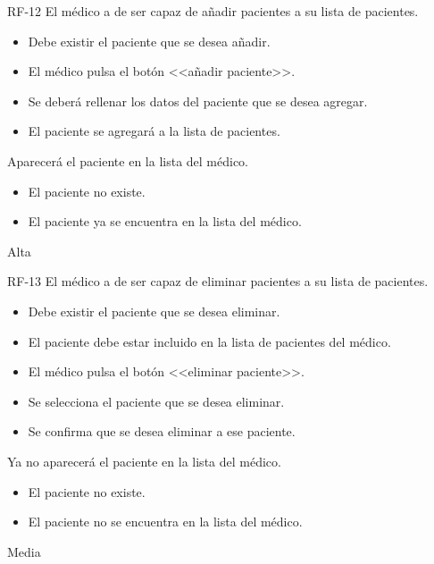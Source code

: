 {RF-12}
{El médico a de ser capaz de añadir pacientes a su lista de pacientes.}
{	\begin{itemize}
	\def\labelenumi{\arabic{enumi}.}
	\tightlist
	\item Debe existir el paciente que se desea añadir.
	\end{itemize}}
{
	\begin{itemize}
	\def\labelenumi{\arabic{enumi}.}
	\tightlist

    \item El médico pulsa el botón <<añadir paciente>>.
    \item Se deberá rellenar los datos del paciente que se desea agregar.
    \item El paciente se agregará a la lista de pacientes.
    
    \end{itemize}
}
{Aparecerá el paciente en la lista del médico.}
{	\begin{itemize}
	\def\labelenumi{\arabic{enumi}.}
	\tightlist

    \item El paciente no existe.
    \item El paciente ya se encuentra en la lista del médico.
    
    \end{itemize}}
{Alta}

{RF-13}
{El médico a de ser capaz de eliminar pacientes a su lista de pacientes.}
{	\begin{itemize}
	\def\labelenumi{\arabic{enumi}.}
	\tightlist
	\item Debe existir el paciente que se desea eliminar.
	\item El paciente debe estar incluido en la lista de pacientes del médico.
	\end{itemize}}
{
	\begin{itemize}
	\def\labelenumi{\arabic{enumi}.}
	\tightlist

    \item El médico pulsa el botón <<eliminar paciente>>.
    \item Se selecciona el paciente que se desea eliminar.
	\item Se confirma que se desea eliminar a ese paciente.
    
    \end{itemize}
}
{Ya no aparecerá el paciente en la lista del médico.}
{	\begin{itemize}
	\def\labelenumi{\arabic{enumi}.}
	\tightlist

    \item El paciente no existe.
    \item El paciente no se encuentra en la lista del médico.
    
    \end{itemize}}
{Media}


